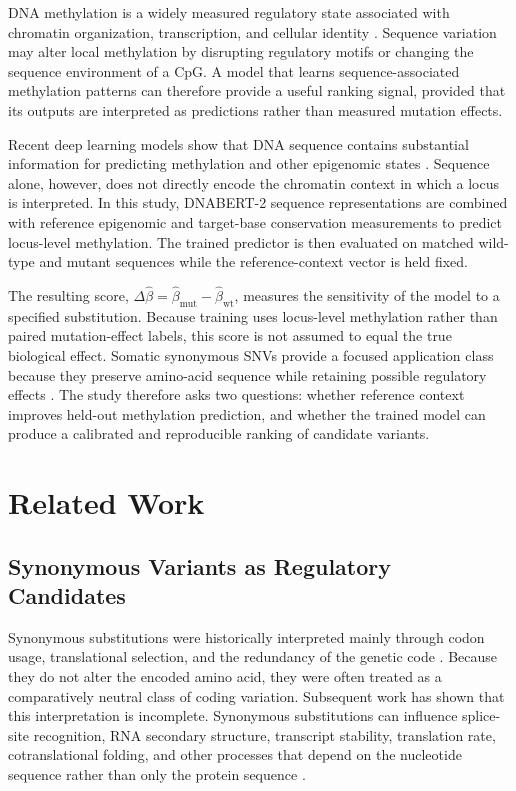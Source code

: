 \documentclass[10pt,letterpaper,twocolumn]{article}
\begin{document}
DNA methylation is a widely measured regulatory state associated with
chromatin organization, transcription, and cellular identity
\cite{jones2012functions,schubeler2015function}. Sequence variation may
alter local methylation by disrupting regulatory motifs or changing the
sequence environment of a CpG. A model that learns sequence-associated
methylation patterns can therefore provide a useful ranking signal,
provided that its outputs are interpreted as predictions rather than
measured mutation effects.

Recent deep learning models show that DNA sequence contains substantial
information for predicting methylation and other epigenomic states
\cite{zhou2015predicting,kelley2016quential,avsec2021effective}.
Sequence alone, however, does not directly encode the chromatin context
in which a locus is interpreted. In this study, DNABERT-2 sequence
representations are combined with reference epigenomic and target-base
conservation measurements to predict locus-level methylation. The
trained predictor is then evaluated on matched wild-type and mutant
sequences while the reference-context vector is held fixed.

The resulting score,
$\Delta\hat{\beta}=\hat{\beta}_{\mathrm{mut}}-
\hat{\beta}_{\mathrm{wt}}$, measures the sensitivity of the model to a
specified substitution. Because training uses locus-level methylation
rather than paired mutation-effect labels, this score is not assumed to
equal the true biological effect. Somatic synonymous SNVs provide a
focused application class because they preserve amino-acid sequence
while retaining possible regulatory effects \cite{supek2014synonymous}.
The study therefore asks two questions: whether reference context
improves held-out methylation prediction, and whether the trained model
can produce a calibrated and reproducible ranking of candidate
variants.

\section{Related Work}

\subsection{Synonymous Variants as Regulatory Candidates}

Synonymous substitutions were historically interpreted mainly through
codon usage, translational selection, and the redundancy of the genetic
code \cite{ikemura1981codon}. Because they do not alter the encoded
amino acid, they were often treated as a comparatively neutral class of
coding variation. Subsequent work has shown that this interpretation is
incomplete. Synonymous substitutions can influence splice-site
recognition, RNA secondary structure, transcript stability, translation
rate, cotranslational folding, and other processes that depend on the
nucleotide sequence rather than only the protein sequence
\cite{sauna2011understanding}.
\end{document}
